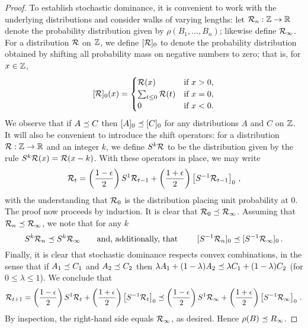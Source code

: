 \begin{proof}
  To establish stochastic dominance, it is convenient to work with the
  underlying distributions and consider walks of varying lengths: let
  $\mathcal{R}_n: \mathbb{Z} \rightarrow \mathbb{R}$ denote the probability distribution given by
  $\rho(B_1, \ldots, B_n)$; likewise
  define $\mathcal{R}_\infty$. For a distribution $\mathcal{R}$ on $\mathbb{Z}$, we define $[\mathcal{R}]_0$
  to denote the probability distribution obtained by shifting all
  probability mass on negative numbers to zero; that is, for $x \in \mathbb{Z}$,
  \[
    [\mathcal{R}]_0(x) = \begin{cases} \mathcal{R}(x) & \text{if $x > 0$},\\
      \sum_{t \leq 0} \mathcal{R}(t) & \text{if $x = 0$},\\
      0 & \text{if $x < 0$.}
    \end{cases}
  \]
  We observe that if $A \preceq C$ then $[A]_0 \preceq [C]_0$ for any
  distributions $A$ and $C$ on $\mathbb{Z}$. It will also be convenient to
  introduce the shift operators: for a distribution
  $\mathcal{R}: \mathbb{Z} \rightarrow \mathbb{R}$ and an integer $k$, we define $S^k\mathcal{R}$ to be the
  distribution given by the rule $S^k\mathcal{R}(x) = \mathcal{R}(x-k)$. With these
  operators in place, we may write
  \[
    \mathcal{R}_t = \left(\frac{1 - \epsilon}{2}\right) S^1 \mathcal{R}_{t-1} +
      \left(\frac{1 + \epsilon}{2}\right) \left[S^{-1}\mathcal{R}_{t-1} \right]_0\,,
  \]
  with the understanding that $\mathcal{R}_0$ is the distribution placing unit probability at $0$. The proof now proceeds by induction. It is clear that $\mathcal{R}_0 \preceq \mathcal{R}_\infty$. Assuming that $\mathcal{R}_n \preceq \mathcal{R}_\infty$, we note that for any $k$
  \[
    S^k \mathcal{R}_n \preceq S^k \mathcal{R}_\infty \qquad \text{and, additionally, that
    }\qquad [S^{-1}\mathcal{R}_n]_0 \preceq [S^{-1}\mathcal{R}_{\infty}]_0\,.
  \]
  Finally, it is clear that stochastic dominance respects convex combinations, 
  in the sense that if $A_1 \preceq C_1$ and $A_2 \preceq C_2$ then 
  $\lambda A_1 + (1-\lambda) A_2 \preceq \lambda C_1 + (1-\lambda) C_2$ (for $0 \leq \lambda \leq 1$). We conclude that
  \[
    \mathcal{R}_{t+1} = \left(\frac{1 - \epsilon}{2}\right) S^1 \mathcal{R}_{t} +
      \left(\frac{1 + \epsilon}{2}\right) \left[S^{-1}\mathcal{R}_{t} \right]_0 \preceq \left(\frac{1 - \epsilon}{2}\right) S^1 \mathcal{R}_{\infty} +
      \left(\frac{1 + \epsilon}{2}\right) \left[S^{-1}\mathcal{R}_{\infty} \right]_0 
      \,.
  \]
  By inspection, the right-hand side equals $\mathcal{R}_{\infty}$, as desired. 
  Hence $\rho(B) \preceq R_\infty$.
\end{proof}

